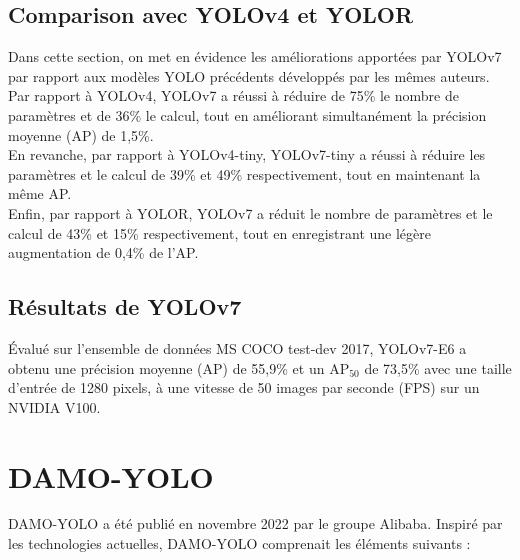 \documentclass{article}
\begin{document}
\subsection{Comparison avec YOLOv4 et YOLOR}
Dans cette section, on met en évidence les améliorations apportées par YOLOv7 par rapport aux modèles YOLO précédents développés par les mêmes auteurs.
\vspace{.2cm}\\
Par rapport à YOLOv4, YOLOv7 a réussi à réduire de 75\% le nombre de paramètres et de 36\% le calcul, tout en améliorant simultanément la précision moyenne (AP) de 1,5\%.
\vspace{.2cm}\\
En revanche, par rapport à YOLOv4-tiny, YOLOv7-tiny a réussi à réduire les paramètres et le calcul de 39\% et 49\% respectivement, tout en maintenant la même AP.
\vspace{.2cm}\\
Enfin, par rapport à YOLOR, YOLOv7 a réduit le nombre de paramètres et le calcul de 43\% et 15\% respectivement, tout en enregistrant une légère augmentation de 0,4\% de l'AP.

\subsection{Résultats de YOLOv7}
Évalué sur l'ensemble de données MS COCO test-dev 2017, YOLOv7-E6 a obtenu une précision moyenne (AP) de 55,9\% et un AP$_{50}$ de 73,5\% avec une taille d'entrée de 1280 pixels, à une vitesse de 50 images par seconde (FPS) sur un NVIDIA V100.


\section{DAMO-YOLO}
DAMO-YOLO \cite{97} a été publié en novembre 2022 par le groupe Alibaba. Inspiré par les technologies actuelles, DAMO-YOLO comprenait les éléments suivants :
\end{document}

